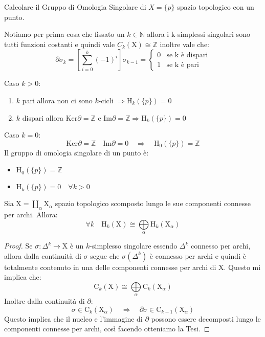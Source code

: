 \documentclass[11pt, a4paper, twoside]{article}
\begin{document}
\begin{ese}
	Calcolare il Gruppo di Omologia Singolare di $X=\{p\}$ spazio topologico con un punto.
\end{ese}
\begin{sol}
	Notiamo per prima cosa che fissato un $k\in\mathbb{N}$ allora i k-simplessi singolari sono tutti funzioni costanti e quindi vale $C_k(\text{X})\cong\mathbb{Z}$ inoltre vale che: 
	\[
		\partial\sigma_k=\left[\sum\limits_{i=0}^k(-1)^i\right]\sigma_{k-1}=
		 \begin{cases}
			0 & \text{se k è dispari} \\
			1 & \text{se k è pari}
		\end{cases}
	\]
	\begin{center}
	\end{center}
	Caso $k>0$:
	\begin{enumerate}
		\item $k$ pari allora non ci sono $k$-cicli $\Rightarrow \text{H}_k(\{p\})=0$
		\item $k$ dispari allora $\text{Ker}\partial=\mathbb{Z}$ e $\text{Im}\partial=\mathbb{Z}\Rightarrow \text{H}_k(\{p\})=0$
	\end{enumerate} 
	Caso $k=0$:
	\[
		 \text{Ker}\partial=\mathbb{Z} \quad \text{Im}\partial=0\quad\Rightarrow \quad\text{H}_0(\{p\})=\mathbb{Z}
	\]
	Il gruppo di omologia singolare di un punto è:
	\begin{itemize}
		\item $\text{H}_0(\{p\})=\mathbb{Z}$
		\item $\text{H}_k(\{p\})=0\quad \forall k>0$
	\end{itemize}
\end{sol}

\begin{prop}{}
	Sia X$=\coprod\limits_{\alpha}\text{X}_{\alpha}$ spazio topologico scomposto lungo le sue componenti connesse per archi. Allora:
	\[
		\forall k \quad \text{H}_k(\text{X})\cong\bigoplus\limits_{\alpha}\text{H}_k(\text{X}_{\alpha})
	\]
\end{prop}
\begin{proof}
	Se $\sigma:\Delta^k\rightarrow \text{X}$ è un $k$-simplesso singolare essendo $\Delta^k$ connesso per archi, allora dalla continuità di $\sigma$ segue che $\sigma(\Delta^k)$ è connesso per archi e quindi è totalmente contenuto in una delle componenti connesse per archi di X. Questo mi implica che:
	\[
		\text{C}_k(\text{X})\cong\bigoplus\limits_{\alpha}\text{C}_k(\text{X}_{\alpha})
	\]
	Inoltre  dalla continuità di $\partial$:
	\[
		\sigma \in\text{C}_k(\text{X}_{\alpha})\quad \Rightarrow \quad \partial\sigma\in\text{C}_{k-1}(\text{X}_{\alpha})
	\]
	Questo implica che il nucleo e l'immagine di $\partial$ possono essere decomposti lungo le componenti connesse per archi, così facendo otteniamo la Tesi.
\end{proof}
\end{document}

